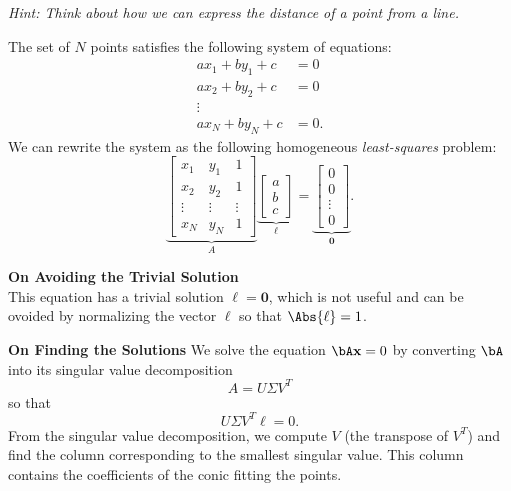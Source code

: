 \begin{problem}
\begin{enumroman}
      \step
      \emph{Hint: Think about how we can express the distance of a
      point from a line.}
      \begin{answer}
        The set of $N$ points satisfies the following system of equations:
        \begin{align*}
          ax_1 + by_1 + c &= 0 \\
          ax_2 + by_2 + c &= 0 \\
          \vdots \\
          ax_N + by_N + c &= 0.
        \end{align*}
        We can rewrite the system as the following homogeneous
        \emph{least-squares} problem:
        \[
          \underbrace{\begin{bmatrix}
            x_1 & y_1 & 1 \\
            x_2 & y_2 & 1 \\
            \vdots & \vdots & \vdots \\
            x_N & y_N & 1
          \end{bmatrix}}_{A}
          \underbrace{\begin{bmatrix}
            a \\
            b \\
            c
          \end{bmatrix}}_{\ell}
          =
          \underbrace{\begin{bmatrix}
            0 \\
            0 \\
            \vdots \\
            0
          \end{bmatrix}}_{\mathbf{0}}.
        \]

        \step
        \textbf{On Avoiding the Trivial Solution} \\
        This equation has a trivial solution $\ell = \mathbf{0}$,
        which is not useful and can be ovoided by normalizing
        the vector $\ell$ so that $\Abs{\ell} = 1$.



        \step
        \textbf{On Finding the Solutions}
          We solve the equation $\bA\bx = 0$ by converting $\bA$ into
          its singular value decomposition
          \[
            A = U \Sigma V^T
          \]
          so that
          \[
            U \Sigma V^T \ell = 0.
          \]
          From the singular value decomposition, we compute $V$
          (the transpose of $V^T$) and find the column corresponding
          to the smallest singular value.
          This column contains the coefficients of the conic
          fitting the points.


\end{answer}
\end{enumroman}
\end{problem}
